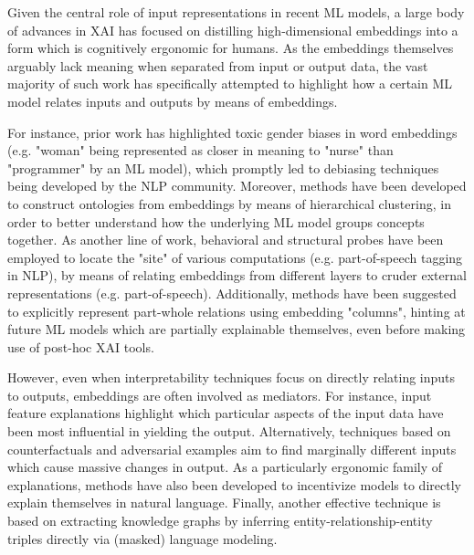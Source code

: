 Given the central role of input representations in recent ML models, a large body of advances in XAI has focused on distilling high-dimensional embeddings into a form which is cognitively ergonomic for humans. As the embeddings themselves arguably lack meaning when separated from input or output data, the vast majority of such work has specifically attempted to highlight how a certain ML model relates inputs and outputs by means of embeddings.

For instance, prior work has highlighted toxic gender biases in word embeddings (e.g. "woman" being represented as closer in meaning to "nurse" than "programmer" by an ML model), which promptly led to debiasing techniques being developed by the NLP community. Moreover, methods have been developed to construct ontologies from embeddings by means of hierarchical clustering, in order to better understand how the underlying ML model groups concepts together. As another line of work, behavioral and structural probes have been employed to locate the "site" of various computations (e.g. part-of-speech tagging in NLP), by means of relating embeddings from different layers to cruder external representations (e.g. part-of-speech). Additionally, methods have been suggested to explicitly represent part-whole relations using embedding "columns", hinting at future ML models which are partially explainable themselves, even before making use of post-hoc XAI tools.

However, even when interpretability techniques focus on directly relating inputs to outputs, embeddings are often involved as mediators. For instance, input feature explanations highlight which particular aspects of the input data have been most influential in yielding the output. Alternatively, techniques based on counterfactuals and adversarial examples aim to find marginally different inputs which cause massive changes in output. As a particularly ergonomic family of explanations, methods have also been developed to incentivize models to directly explain themselves in natural language. Finally, another effective technique is based on extracting knowledge graphs by inferring entity-relationship-entity triples directly via (masked) language modeling.

